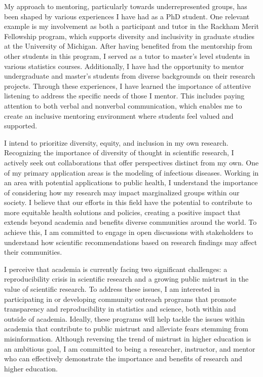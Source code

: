 \documentclass[11pt]{article}
\begin{document}
My approach to mentoring, particularly towards underrepresented groups, has been shaped by various experiences I have had as a PhD student.
One relevant example is my involvement as both a participant and tutor in the Rackham Merit Fellowship program, which supports diversity and inclusivity in graduate studies at the University of Michigan.
After having benefited from the mentorship from other students in this program, I served as a tutor to master's level students in various statistics courses.
Additionally, I have had the opportunity to mentor undergraduate and master's students from diverse backgrounds on their research projects.
Through these experiences, I have learned the importance of attentive listening to address the specific needs of those I mentor.
This includes paying attention to both verbal and nonverbal communication, which enables me to create an inclusive mentoring environment where students feel valued and supported.

I intend to prioritize diversity, equity, and inclusion in my own research.
Recognizing the importance of diversity of thought in scientific research, I actively seek out collaborations that offer perspectives distinct from my own.
One of my primary application areas is the modeling of infectious diseases.
Working in an area with potential applications to public health, I understand the importance of considering how my research may impact marginalized groups within our society.
I believe that our efforts in this field have the potential to contribute to more equitable health solutions and policies, creating a positive impact that extends beyond academia and benefits diverse communities around the world.
To achieve this, I am committed to engage in open discussions with stakeholders to understand how scientific recommendations based on research findings may affect their communities.

I perceive that academia is currently facing two significant challenges: a reproducibility crisis in scientific research and a growing public mistrust in the value of scientific research.
To address these issues, I am interested in participating in or developing community outreach programs that promote transparency and reproducibility in statistics and science, both within and outside of academia.
Ideally, these programs will help tackle the issues within academia that contribute to public mistrust and alleviate fears stemming from misinformation.
Although reversing the trend of mistrust in higher education is an ambitious goal, I am committed to being a researcher, instructor, and mentor who can effectively demonstrate the importance and benefits of research and higher education.
\end{document}
